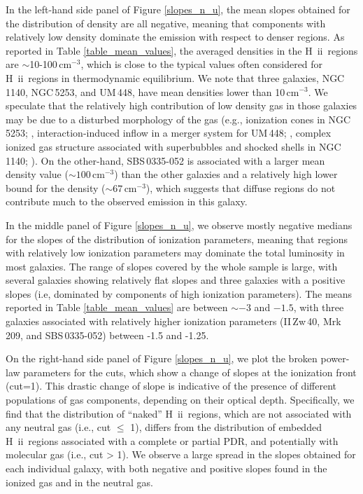\documentclass{aa}
\newcommand{\toadd}[1]{{\color{red}{{[TO ADD: \bf #1]}}}}
\newcommand{\hii}{H~{\sc ii}}
\begin{document}
In the left-hand side panel of Figure \ref{slopes_n_u}, the mean slopes obtained for the distribution of density are all negative, meaning that components with relatively low density dominate the emission with respect to denser regions. As reported in Table \ref{table_mean_values}, the averaged densities in the \hii\ regions are $\sim$10-100\,cm$^{-3}$, which is close to the typical values often considered for \hii\ regions in thermodynamic equilibrium. We note that three galaxies, NGC\,1140, NGC\,5253, and UM\,448, have mean densities lower than 10\,cm$^{-3}$. We speculate that the relatively high contribution of low density gas in those galaxies may be due to a disturbed morphology of the gas (e.g., ionization cones in NGC\,5253; \citealt{zastrow_ionization_2011}, interaction-induced inflow in a merger system for UM\,448; \citealt{James_2013}, complex ionized gas structure associated with superbubbles and shocked shells in NGC\,1140; \citealt{Westmoquette_ngc1140_2010}). On the other-hand, SBS\,0335-052 is associated with a larger mean density value ($\sim 100$\,cm$^{-3}$) than the other galaxies and a relatively high lower bound for the density ($\sim 67$\,cm$^{-3}$), which suggests that diffuse regions do not contribute much to the observed emission in this galaxy. %

In the middle panel of Figure \ref{slopes_n_u}, we observe mostly negative medians for the slopes of the distribution of ionization parameters, meaning that regions with relatively low ionization parameters may dominate the total luminosity in most galaxies. The range of slopes covered by the whole sample is large, with several galaxies showing relatively flat slopes and three galaxies with a positive slopes (i.e, dominated by components of high ionization parameters). The means reported in Table \ref{table_mean_values} are between $\sim -3$ and $-1.5$, with three galaxies associated with relatively higher ionization parameters (II\,Zw\,40, Mrk\,209, and SBS\,0335-052) between -1.5 and -1.25.

On the right-hand side panel of Figure \ref{slopes_n_u}, we plot the broken power-law parameters for the cuts, which show a change of slopes at the ionization front (cut=1). %
This drastic change of slope is indicative of the presence of different populations of gas components, depending on their optical depth. Specifically, we find that the distribution of “naked” \hii\ regions, which are not associated with any neutral gas (i.e., cut $\leq$ 1), differs from the distribution of embedded \hii\ regions associated with a complete or partial PDR, and potentially with molecular gas (i.e., cut > 1). We observe a large spread in the slopes obtained for each individual galaxy, with both negative and positive slopes found in the ionized gas and in the neutral gas. 
\end{document}
